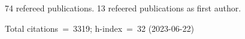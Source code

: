 74 refereed publications. 13 refeered publications as first author.

Total citations~=~3319; h-index~=~32 (2023-06-22)